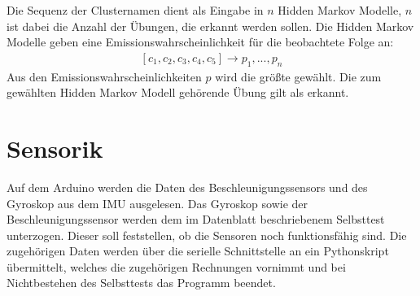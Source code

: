 \documentclass{article}
\begin{document}
Die Sequenz der Clusternamen dient als Eingabe in $n$ Hidden Markov Modelle, $n$ ist dabei die Anzahl der Übungen, die erkannt werden sollen.
Die Hidden Markov Modelle geben eine Emissionswahrscheinlichkeit für die beobachtete Folge an:
\begin{align*}
\left[c_1, c_2, c_3, c_4, c_5\right] \rightarrow p_1, ..., p_n
\end{align*}
Aus den Emissionswahrscheinlichkeiten $p$ wird die größte gewählt.
Die zum gewählten Hidden Markov Modell gehörende Übung gilt als erkannt.

\newpage
\section{Sensorik}
\label{sec:sensors}
Auf dem Arduino werden die Daten des Beschleunigungssensors und des Gyroskop aus dem IMU ausgelesen.
Das Gyroskop sowie der Beschleunigungssensor werden dem im Datenblatt beschriebenem Selbsttest unterzogen.
Dieser soll feststellen, ob die Sensoren noch funktionsfähig sind.
Die zugehörigen Daten werden über die serielle Schnittstelle an ein Pythonskript übermittelt, welches die zugehörigen Rechnungen vornimmt und bei Nichtbestehen des Selbsttests das Programm beendet.
\end{document}
